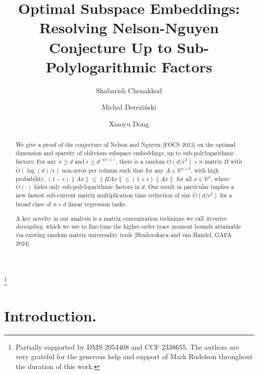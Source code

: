 \documentclass[11pt]{amsart}
\numberwithin{equation}{section}
\numberwithin{equation}{section}
\begin{document}
\title[Optimal Subspace Embeddings]{
Optimal Subspace Embeddings: Resolving Nelson-Nguyen Conjecture Up to Sub-Polylogarithmic Factors
}
\date{}
\author{Shabarish Chenakkod}
\author{Micha{\l} Derezi\'nski}
\author{Xiaoyu Dong}
\thanks{Partially supported by DMS 2054408 and CCF 2338655. The authors are very grateful for the generous help and support of Mark Rudelson throughout the duration of this work.}
\address{University of Michigan, Ann Arbor, MI, USA}
\address{National University of Singapore, Singapore}



\begin{abstract}
We give a proof of the conjecture of Nelson and Nguyen [FOCS 2013] on the optimal dimension and sparsity of oblivious subspace embeddings, up to sub-polylogarithmic factors: For any $n\geq d$ and $\epsilon\geq d^{-O(1)}$, there is a random $\tilde O(d/\epsilon^2)\times n$ matrix $\Pi$ with $\tilde O(\log(d)/\epsilon)$ non-zeros per column such that for any $A\in\mathbb{R}^{n\times d}$, with high probability, $(1-\epsilon)\|Ax\|\leq\|\Pi Ax\|\leq(1+\epsilon)\|Ax\|$ for all $x\in\mathbb{R}^d$, where $\tilde O(\cdot)$ hides only sub-polylogarithmic factors in $d$. Our result in particular implies a new fastest sub-current matrix multiplication time reduction of size $\tilde O(d/\epsilon^2)$ for a broad class of $n\times d$ linear regression tasks.

A key novelty in our analysis is a matrix concentration technique we call \emph{iterative decoupling}, which we use to fine-tune the higher-order trace moment bounds attainable via existing random matrix universality tools [Brailovskaya and van Handel, GAFA 2024]. 

\end{abstract}

\maketitle


\thispagestyle{empty}
\newpage
\setcounter{page}{1}

\section{Introduction.}
\end{document}
